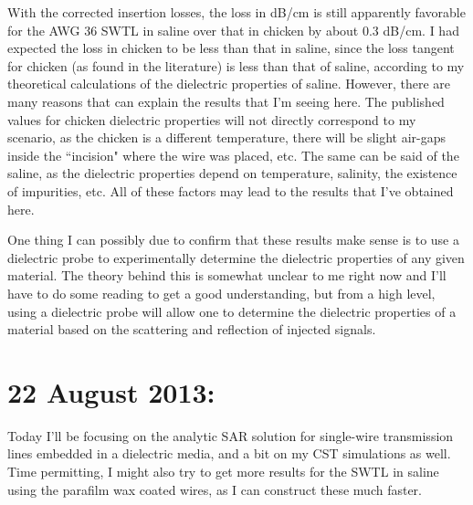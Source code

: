 \documentclass[12pt,onecolumn,titlepage]{article}
\begin{document}
With the corrected insertion losses, the loss in dB/cm is still apparently favorable for the AWG 36 SWTL in saline over that in chicken by about 0.3 dB/cm. I had expected the loss in chicken to be less than that in saline, since the loss tangent for chicken (as found in the literature) is less than that of saline, according to my theoretical calculations of the dielectric properties of saline. However, there are many reasons that can explain the results that I'm seeing here. The published values for chicken dielectric properties will not directly correspond to my scenario, as the chicken is a different temperature, there will be slight air-gaps inside the ``incision" where the wire was placed, etc. The same can be said of the saline, as the dielectric properties depend on temperature, salinity, the existence of impurities, etc. All of these factors may lead to the results that I've obtained here. 

One thing I can possibly due to confirm that these results make sense is to use a dielectric probe to experimentally determine the dielectric properties of any given material. The theory behind this is somewhat unclear to me right now and I'll have to do some reading to get a good understanding, but from a high level, using a dielectric probe will allow one to determine the dielectric properties of a material based on the scattering and reflection of injected signals.





\clearpage
\section{22 August 2013:}

\indent \indent Today I'll be focusing on the analytic SAR solution for single-wire transmission lines embedded in a dielectric media, and a bit on my CST simulations as well. Time permitting, I might also try to get more results for the SWTL in saline using the parafilm wax coated wires, as I can construct these much faster.
\end{document}
